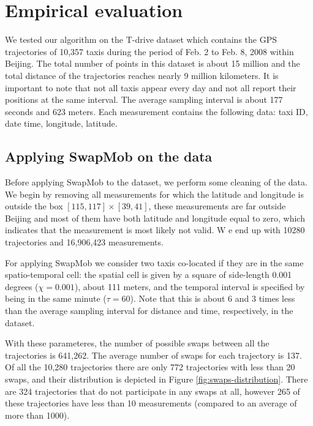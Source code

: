 \documentclass[times,twocolumn,final,authoryear]{elsarticle}
\begin{document}
\section{Empirical evaluation}\label{Sec:evaluation}
We tested our algorithm on the T-drive dataset
\citep{Yuan2010,Yuan2011} which contains the GPS trajectories of
10,357 taxis during the period of Feb. 2 to Feb. 8, 2008 within
Beijing. The total number of points in this dataset is about 15
million and the total distance of the trajectories reaches nearly 9
million kilometers. It is important to note that not all taxis appear
every day and not all report their positions at the same interval. The
average sampling interval is about 177 seconds and 623 meters. Each
measurement contains the following data: taxi ID, date time,
longitude, latitude.

\subsection{Applying SwapMob on the data}
Before applying SwapMob to the dataset, we perform some cleaning of the
data. We begin by removing all measurements for which the latitude and
longitude is outside the box $[115, 117] \times [39, 41]$, these
measurements are far outside Beijing and most of them have both
latitude and longitude equal to zero, which indicates that the
measurement is most likely not valid. W%
e end up with 10280 trajectories and 16,906,423
measurements.

For applying SwapMob we consider two taxis co-located if they are in
the same spatio-temporal cell: the spatial cell is given by a square of side-length 0.001 degrees ($\chi = 0.001$), about 111
meters, and the temporal interval is specified by being in the same minute ($\tau = 60$). 
Note that this is about 6 and 3 times less than the average sampling interval for distance and time, respectively, in the dataset.

With these parameteres, the number of possible swaps between all the
trajectories is 641,262. The average number of swaps for each
trajectory is 137. Of all the 10,280 trajectories there are only 772 trajectories with less than 20 swaps, and their distribution is depicted in Figure
\ref{fig:swaps-distribution}. There are 324 trajectories that do not
participate in any swaps at all, however 265 of these trajectories
have less than 10 measurements (compared to an average of more than
1000). 
\end{document}
